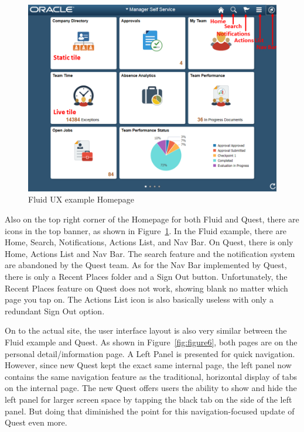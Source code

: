 \documentclass[conference]{IEEEtran}
\begin{document}
\begin{figure}[htdp]
\centering
  \includegraphics[width=1\columnwidth]{Fluid_homepage_example.png}
  \caption{Fluid UX example Homepage \cite{b7}}
  \label{fig:figure5}
\end{figure}

Also on the top right corner of the Homepage for both Fluid and Quest, there are icons in the top banner, as shown in Figure~\ref{fig:figure5}. In the Fluid example, there are Home, Search, Notifications, Actions List, and Nav Bar. On Quest, there is only Home, Actions List and Nav Bar. The search feature and the notification system are abandoned by the Quest team. As for the Nav Bar implemented by Quest, there is only a Recent Places folder and a Sign Out button. Unfortunately, the Recent Places feature on Quest does not work, showing blank no matter which page you tap on. The Actions List icon is also basically useless with only a redundant Sign Out option.

On to the actual site, the user interface layout is also very similar between the Fluid example and Quest. As shown in Figure~\ref{fig:figure6}, both pages are on the personal detail/information page. A Left Panel is presented for quick navigation. However, since new Quest kept the exact same internal page, the left panel now contains the same navigation feature as the traditional, horizontal display of tabs on the internal page. The new Quest offers users the ability to show and hide the left panel for larger screen space by tapping the black tab on the side of the left panel. But doing that diminished the point for this navigation-focused update of Quest even more. 
\end{document}
